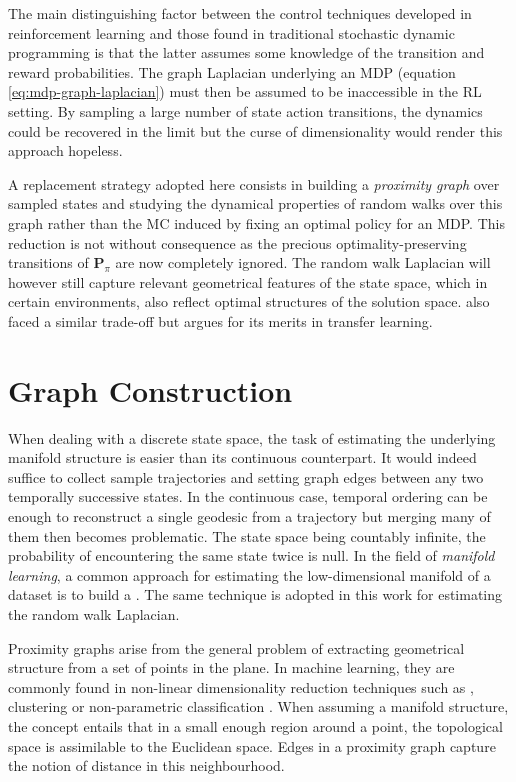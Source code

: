 \documentclass[12pt, oneside, extrafontsizes]{memoir}  %
\newcommand{\termidx}[1]{\index{#1}{\textbf{#1}}}
\theoremstyle{plain}
\theoremstyle{definition}
\begin{document}
The main distinguishing factor between the control techniques developed in
reinforcement learning and those found in traditional stochastic dynamic programming
is that the latter assumes some knowledge of the transition and reward probabilities. The graph Laplacian underlying an MDP (equation \ref{eq:mdp-graph-laplacian}) must then be assumed to be inaccessible in the RL setting. By sampling a large number of state action transitions, the dynamics could be recovered in the limit but the curse of dimensionality would render this approach hopeless.

A replacement strategy adopted here consists in building a \textit{proximity graph}
over sampled states and studying the dynamical properties of random walks over this
graph rather than the MC induced by fixing an optimal policy for an MDP. This reduction is not without consequence as the precious optimality-preserving transitions of $\mathbf{P}_\pi$ are now completely ignored. The random walk Laplacian will however still capture relevant geometrical features of the state space, which in certain environments,  also reflect optimal structures of the solution space. \cite{Mahadevan2007} also faced a similar trade-off but argues for its merits in transfer learning.

\section{Graph Construction}

When dealing with a discrete state space, the task of estimating the underlying manifold structure is easier than its continuous counterpart. It would indeed suffice to collect sample trajectories and setting graph edges between any two temporally successive states. In the continuous case, temporal ordering can be enough to reconstruct a single geodesic from a trajectory but merging many of them then becomes problematic. The state space being countably infinite, the probability of encountering the same state twice is null.  In the field of \textit{manifold learning}, a common approach for estimating the low-dimensional manifold of a dataset is to build a \termidx{proximity graph}. The same technique is adopted in this work for estimating the random walk Laplacian.

Proximity graphs arise from the general problem of extracting geometrical structure from a set of points in the plane. In machine learning, they are commonly found in non-linear dimensionality reduction techniques such as \cite{Tenenbaum2000, Roweis2000}, clustering \cite{Luxburg2007} or non-parametric classification \cite{Toussaint2012}. When assuming a manifold structure, the concept entails that in a small enough region around a point, the topological space is assimilable to the Euclidean space. Edges in a proximity graph capture the notion of distance in this neighbourhood. 
\end{document}

